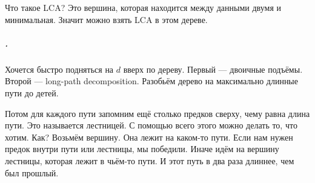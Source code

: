 \documentclass{article}
\begin{document}
    Что такое LCA? Это вершина, которая находится между данными двумя и минимальная. Значит можно взять LCA в этом дереве.
    \subparagraph{.}
    Хочется быстро подняться на $d$ вверх по дереву. Первый --- двоичные подъёмы. Второй --- long-path decomposition. Разобьём дерево на максимально длинные пути до детей.
    \begin{figure}[H]
    \end{figure}\noindent
    Потом для каждого пути запомним ещё столько предков сверху, чему равна длина пути. Это называется лестницей. С помощью всего этого можно делать то, что хотим. Как? Возьмём вершину. Она лежит на каком-то пути. Если нам нужен предок внутри пути или лестницы, мы победили. Иначе идём на вершину лестницы, которая лежит в чьём-то пути. И этот путь в два раза длиннее, чем был прошлый.\\
\end{document}

